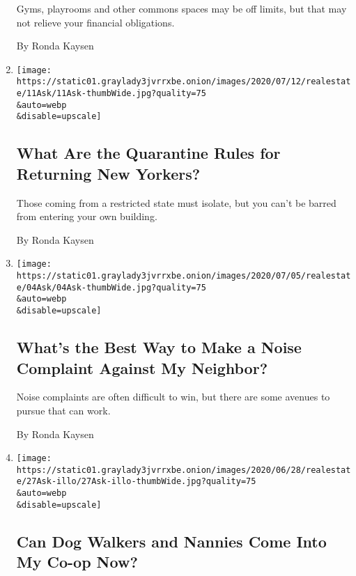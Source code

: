 \begin{enumerate}
  Gyms, playrooms and other commons spaces may be off limits, but that
  may not relieve your financial obligations.

  By Ronda Kaysen
\item
  \href{/2020/07/11/realestate/what-are-the-quarantine-rules-for-returning-new-yorkers-coronavirus.html}{}

  \texttt{[image: https://static01.graylady3jvrrxbe.onion/images/2020/07/12/realestate/11Ask/11Ask-thumbWide.jpg?quality=75\\\&auto=webp\\\&disable=upscale]}

  \hypertarget{what-are-the-quarantine-rules-for-returning-new-yorkers}{%
  \subsection{What Are the Quarantine Rules for Returning New
  Yorkers?}\label{what-are-the-quarantine-rules-for-returning-new-yorkers}}

  Those coming from a restricted state must isolate, but you can't be
  barred from entering your own building.

  By Ronda Kaysen
\item
  \href{/2020/07/04/realestate/whats-the-best-way-to-make-a-noise-complaint-against-my-neighbor.html}{}

  \texttt{[image: https://static01.graylady3jvrrxbe.onion/images/2020/07/05/realestate/04Ask/04Ask-thumbWide.jpg?quality=75\\\&auto=webp\\\&disable=upscale]}

  \hypertarget{whats-the-best-way-to-make-a-noise-complaint-against-my-neighbor}{%
  \subsection{What's the Best Way to Make a Noise Complaint Against My
  Neighbor?}\label{whats-the-best-way-to-make-a-noise-complaint-against-my-neighbor}}

  Noise complaints are often difficult to win, but there are some
  avenues to pursue that can work.

  By Ronda Kaysen
\item
  \href{/2020/06/29/realestate/coronavirus-phase-2-dog-walkers-nannies-co-op.html}{}

  \texttt{[image: https://static01.graylady3jvrrxbe.onion/images/2020/06/28/realestate/27Ask-illo/27Ask-illo-thumbWide.jpg?quality=75\\\&auto=webp\\\&disable=upscale]}

  \hypertarget{can-dog-walkers-and-nannies-come-into-my-co-op-now}{%
  \subsection{Can Dog Walkers and Nannies Come Into My Co-op
  Now?}\label{can-dog-walkers-and-nannies-come-into-my-co-op-now}}


\end{enumerate}
